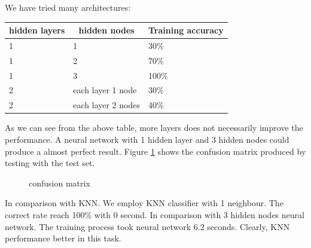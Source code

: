 \documentclass[11pt, a4paper, oneside, openright]{article}
\begin{document}
We have tried many architectures:
\begin{table}[H]
\centering
\begin{tabular}{|l|l|l|}
\hline
\multicolumn{1}{|c|}{\textbf{hidden layers}} & \multicolumn{1}{c|}{\textbf{hidden nodes}} 
& \multicolumn{1}{c|}{\textbf{Training accuracy}}\\
\hline
1     &1 &30\%                                    \\
\hline
1    &2 &70\%                                  \\
\hline
1   &3 &100\%                                             \\
\hline
2 &each layer 1 node &30\%                                            \\
\hline
2  &each layer 2 nodes &40\%                                              \\
\hline
\end{tabular}
\end{table}
As we can see from the above table, more layers does not necessarily improve the performance. A neural network with 1 hidden layer and 3 hidden nodes could produce a almost perfect result.
Figure \ref{fig:confusion} shows the confusion matrix produced by testing with the test set.
  \begin{figure}[!ht]
  \centerline{}
  \caption{confusion matrix}
  \label{fig:confusion}
  \end{figure}
In comparison with KNN.
We employ KNN classifier with 1 neighbour.
The correct rate reach 100\% with 0 second.
In comparison with 3 hidden nodes neural network. The training process took neural network 6.2 seconds. Clearly, KNN performance better in this task.
\end{document}
